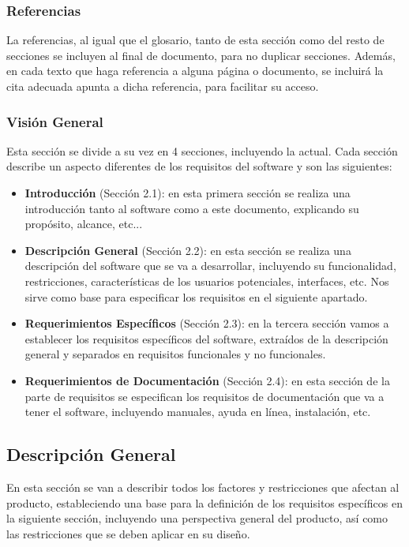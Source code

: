 \subsubsection{Referencias}
La referencias, al igual que el glosario, tanto de esta sección como del resto de secciones se incluyen al final de documento, para no duplicar secciones. Además, en cada texto que haga referencia a alguna página o documento, se incluirá la cita adecuada apunta a dicha referencia, para facilitar su acceso.


\subsubsection{Visión General}
Esta sección se divide a su vez en 4 secciones, incluyendo la actual. Cada sección describe un aspecto diferentes de los requisitos del software y son las siguientes:

\begin{itemize}
	\item \textbf{Introducción} (Sección 2.1): en esta primera sección se realiza una introducción tanto al software como a este documento, explicando su propósito, alcance, etc...
	
	\item \textbf{Descripción General} (Sección 2.2): en esta sección se realiza una descripción del software que se va a desarrollar, incluyendo su funcionalidad, restricciones, características de los usuarios potenciales, interfaces, etc. Nos sirve como base para especificar los requisitos en el siguiente apartado.
	
	\item \textbf{Requerimientos Específicos} (Sección 2.3): en la tercera sección vamos a establecer los requisitos específicos del software, extraídos de la descripción general y separados en requisitos funcionales y no funcionales.
	
	\item \textbf{Requerimientos de Documentación} (Sección 2.4): en esta sección de la parte de requisitos se especifican los requisitos de documentación que va a tener el software, incluyendo manuales, ayuda en línea, instalación, etc.
\end{itemize}

\subsection{Descripción General}
En esta sección se van a describir todos los factores y restricciones que afectan al producto, estableciendo una base para la definición de los requisitos específicos en la siguiente sección, incluyendo una perspectiva general del producto, así como las restricciones que se deben aplicar en su diseño.

